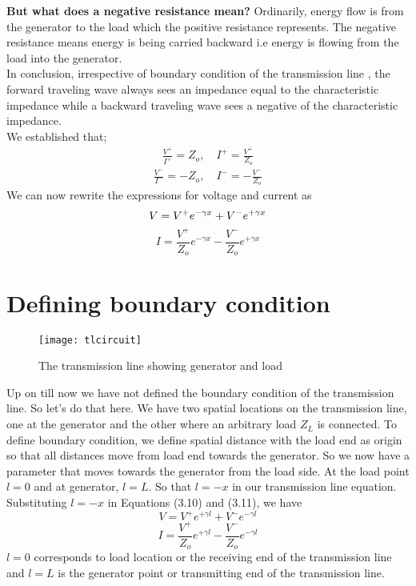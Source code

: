\textbf{But what does a negative resistance mean?}
Ordinarily, energy flow is from the generator to the load which the positive resistance represents. The negative resistance means energy is being carried backward i.e energy is flowing from the load into the generator.\\

In conclusion, irrespective of boundary condition of the transmission line , the forward traveling wave always sees an impedance equal to the characteristic impedance while a backward traveling wave sees a negative of the characteristic impedance.\\

We established that;
\begin{align*}
\frac{V^+}{I^+} = Z_o,\quad I^+ = \frac{V^+}{Z_o}
\end{align*}
\begin{align*}
\frac{V^-}{I^-} = -Z_o,\quad I^- = -\frac{V^-}{Z_o}
\end{align*}
We can now rewrite the expressions for voltage and current as
\begin{equation}
V = V^+e^{-\gamma x}+V^-e^{+\gamma x}\\
\end{equation}
\begin{equation}
I = \frac{V^+}{Z_o}e^{-\gamma x}-\frac{V^-}{Z_o}e^{+\gamma x}
\end{equation}

\section{Defining boundary condition}
\begin{figure}[h]
	\centering
	\texttt{[image: tlcircuit]}
	\caption{The transmission line showing generator and load}
\end{figure}
Up on till now we have not defined the boundary condition of the transmission line. So let's do that here. We have two spatial locations on the transmission line, one at the generator and the other where an arbitrary load $Z_L$ is connected. To define boundary condition, we define spatial distance with the load end as origin so that all distances move from load end towards the generator. So we now have a parameter that moves towards the generator from the load side. At the load point $l = 0$ and at generator, $l = L$. So that $l = -x$ in our transmission line equation. Substituting $l = -x$ in Equations (3.10) and (3.11), we have
\begin{equation}
V = V^+e^{+\gamma l}+V^-e^{-\gamma l}
\end{equation}
\begin{equation}
I = \frac{V^+}{Z_o}e^{+\gamma l}-\frac{V^-}{Z_o}e^{-\gamma l}
\end{equation}
$l = 0$ corresponds to load location or the receiving end of the transmission line and $l = L$ is the generator point or transmitting end of the transmission line.

